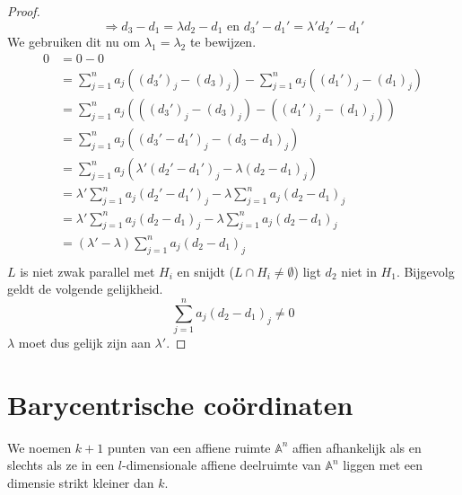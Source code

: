 \documentclass[main.tex]{subfiles}
\begin{document}
\begin{st}
\begin{proof}
    \[ \Rightarrow d_{3}-d_{1} = \lambda {d_{2}-d_{1}} \text{ en } d_{3}'-d_{1}' = \lambda' d_{2}'-d_{1}' \]
    We gebruiken dit nu om $\lambda_{1} = \lambda_{2}$ te bewijzen.
    \[
    \begin{array}{rl}
      0 &= 0 - 0\\
        &= \sum_{j=1}^{n}a_{j}((d_{3}')_{j}-(d_{3})_{j}) - \sum_{j=1}^{n}a_{j}((d_{1}')_{j}-(d_{1})_{j}) \\
        &= \sum_{j=1}^{n}a_{j}(((d_{3}')_{j}-(d_{3})_{j}) - ((d_{1}')_{j}-(d_{1})_{j})) \\
        &= \sum_{j=1}^{n}a_{j}((d_{3}' - d_{1}')_{j} - (d_{3} -d_{1})_{j}) \\
        &= \sum_{j=1}^{n}a_{j}(\lambda'(d_{2}' - d_{1}')_{j} - \lambda(d_{2} -d_{1})_{j}) \\
        &= \lambda'\sum_{j=1}^{n}a_{j}(d_{2}' - d_{1}')_{j} - \lambda\sum_{j=1}^{n}a_{j}(d_{2} -d_{1})_{j} \\
        &= \lambda'\sum_{j=1}^{n}a_{j}(d_{2} - d_{1})_{j} - \lambda\sum_{j=1}^{n}a_{j}(d_{2} -d_{1})_{j} \\
        &= (\lambda' -\lambda)\sum_{j=1}^{n}a_{j}(d_{2} -d_{1})_{j} \\
    \end{array}
    \]
    $L$ is niet zwak parallel met $H_{i}$ en snijdt ($L \cap H_{i} \neq \emptyset$) ligt $d_{2}$ niet in $H_{1}$.
    Bijgevolg geldt de volgende gelijkheid.
    \[ \sum_{j=1}^{n}a_{j}(d_{2} -d_{1})_{j} \neq 0 \]
    $\lambda$ moet dus gelijk zijn aan $\lambda'$.
  \end{proof}
\end{st}

\section{Barycentrische co\"ordinaten}
\label{sec:baryc-coordinaten}

\begin{de}
  \label{de:affien-afhankelijk}
  We noemen $k+1$ punten van een affiene ruimte $\mathbb{A}^{n}$ affien afhankelijk als en slechts als ze in een $l$-dimensionale affiene deelruimte van $\mathbb{A}^{n}$ liggen met een dimensie strikt kleiner dan $k$.
\end{de}
\end{document}
